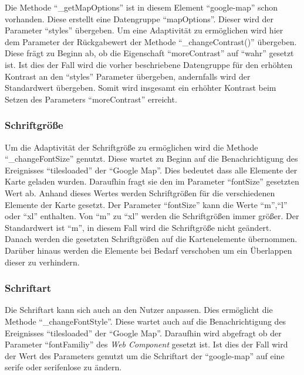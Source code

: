 \documentclass[12pt, paper=a4, bibtotoc, toc=listof, headsepline=true]{scrreprt}
\begin{document}
		Die Methode \enquote{\_getMapOptions} ist in diesem Element \enquote{google-map} schon vorhanden. Diese erstellt eine Datengruppe \enquote{mapOptions}. Dieser wird der Parameter \enquote{styles} übergeben. Um eine Adaptivität zu ermöglichen wird hier dem Parameter der Rückgabewert der Methode \enquote{\_changeContrast()} übergeben. Diese frägt zu Beginn ab, ob die Eigenschaft \enquote{moreContrast} auf \enquote{wahr} gesetzt ist. Ist dies der Fall wird die vorher beschriebene Datengruppe für den erhöhten Kontrast an den \enquote{styles} Parameter übergeben, andernfalls wird der Standardwert übergeben. Somit wird insgesamt ein erhöhter Kontrast beim Setzen des Parameters \enquote{moreContrast} erreicht.
		\subsubsection{Schriftgröße}
		Um die Adaptivität der Schriftgröße zu ermöglichen wird die Methode \enquote{\_changeFontSize} genutzt. Diese wartet zu Beginn auf die Benachrichtigung des Ereignisses \enquote{tilesloaded} der \enquote{Google Map}. Dies bedeutet dass alle Elemente der Karte geladen wurden. Daraufhin fragt sie den im Parameter \enquote{fontSize} gesetzten Wert ab. Anhand dieses Wertes werden Schriftgrößen für die verschiedenen Elemente der Karte gesetzt. Der Parameter \enquote{fontSize} kann die Werte \enquote{m},\enquote{l} oder \enquote{xl} enthalten. Von \enquote{m} zu \enquote{xl} werden die Schriftgrößen immer größer. Der Standardwert ist \enquote{m}, in diesem Fall wird die Schriftgröße nicht geändert. Danach werden die gesetzten Schriftgrößen auf die Kartenelemente übernommen. Darüber hinaus werden die Elemente bei Bedarf verschoben um ein Überlappen dieser zu verhindern.
		\subsubsection{Schriftart}
		Die Schriftart kann sich auch an den Nutzer anpassen. Dies ermöglicht die Methode \enquote{\_changeFontStyle}. Diese wartet auch auf die Benachrichtigung des Ereignisses \enquote{tilesloaded} der \enquote{Google Map}. Daraufhin wird abgefragt ob der Parameter \enquote{fontFamiliy} des \emph{Web Component} gesetzt ist. Ist dies der Fall wird der Wert des Parameters genutzt um die Schriftart der \enquote{google-map} auf eine serife oder serifenlose zu ändern.
\end{document}
